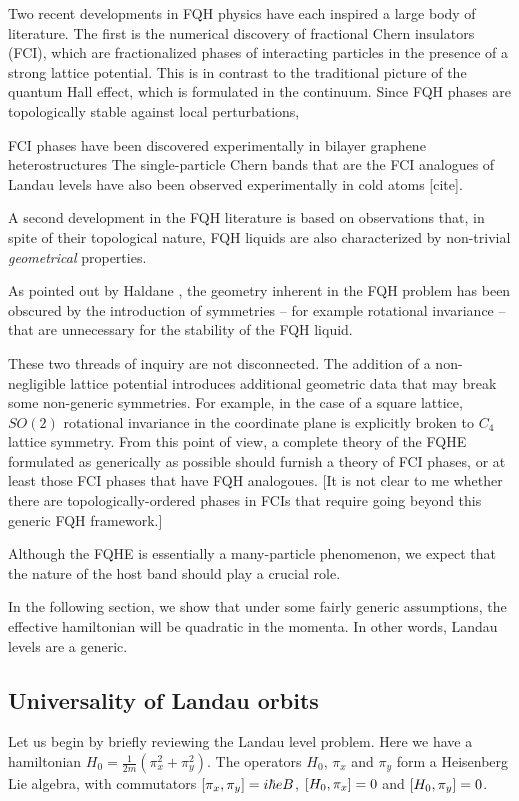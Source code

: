 \documentclass[aps,prb,twocolumn,letterpaper,twoside,nobalancelastpage,groupedaddress,amsmath,amssymb,floatfix,citeautoscript]{revtex4-1}
\begin{document}
Two recent developments in FQH physics have each inspired a large body of literature. The first is the numerical discovery of fractional Chern insulators (FCI), which are fractionalized phases of interacting particles in the presence of a strong lattice potential. This is in contrast to the traditional picture of the quantum Hall effect, which is formulated in the continuum. Since FQH phases are topologically stable against local perturbations,

FCI phases have been discovered experimentally in bilayer graphene heterostructures \cite{Spantoneaan8458} The single-particle Chern bands that are the FCI analogues of Landau levels have also been observed experimentally in cold atoms [cite].

A second development in the FQH literature is based on observations that, in spite of their topological nature, FQH liquids are also characterized by non-trivial \textit{geometrical} properties.

As pointed out by Haldane \cite{Haldane2011}, the geometry inherent in the FQH problem has been obscured by the introduction of symmetries -- for example rotational invariance -- that are unnecessary for the stability of the FQH liquid. 

These two threads of inquiry are not disconnected. The addition of a non-negligible lattice potential introduces additional geometric data that may break some non-generic symmetries. For example, in the case of a square lattice, $SO(2)$ rotational invariance in the coordinate plane is explicitly broken to $C_4$ lattice symmetry. From this point of view, a complete theory of the FQHE formulated as generically as possible should furnish a theory of FCI phases, or at least those FCI phases that have FQH analogoues. [It is not clear to me whether there are topologically-ordered phases in FCIs that require going beyond this generic FQH framework.]


Although the FQHE is essentially a many-particle phenomenon, we expect that the nature of the host band should play a crucial role. 


In the following section, we show that under some fairly generic assumptions, the effective hamiltonian will be quadratic in the momenta. In other words, Landau levels are a generic.


\subsection{Universality of Landau orbits}
Let us begin by briefly reviewing the Landau level problem. Here we have a hamiltonian $H_0 = \frac{1}{2m}\left(\pi_x^2 + \pi_y^2\right).$ The operators $H_0$, $\pi_x$ and $\pi_y$ form a Heisenberg Lie algebra, with commutators $\comm{\pi_x}{\pi_y} = i\hbar e B$, $\comm{H_0}{\pi_x} = 0$ and $\comm{H_0}{\pi_y} = 0$.
\end{document}
